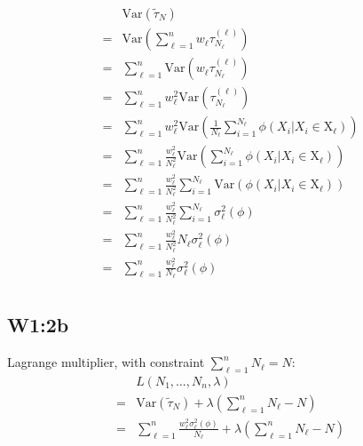 \documentclass{article}
\begin{document}
\begin{align*}
   & \text{Var}(\tilde{\tau}_N) \\
   =& \text{Var}\left(\sum_{\ell=1}^n w_\ell\tau_{N_\ell}^{(\ell)}\right) \\
   =& \sum_{\ell=1}^n \text{Var}\left(w_\ell\tau_{N_\ell}^{(\ell)}\right) \\
   =& \sum_{\ell=1}^n w_\ell^2\text{Var}\left(\tau_{N_\ell}^{(\ell)}\right) \\
   =& \sum_{\ell=1}^n w_\ell^2\text{Var}\left( \frac{1}{N_\ell} \sum_{i=1}^{N_\ell} \phi(X_i|X_i\in\text{X}_\ell) \right) \\
   =& \sum_{\ell=1}^n \frac{w_\ell^2}{N_\ell^2}\text{Var}\left( \sum_{i=1}^{N_\ell} \phi(X_i|X_i\in\text{X}_\ell) \right) \\
   =& \sum_{\ell=1}^n \frac{w_\ell^2}{N_\ell^2}\sum_{i=1}^{N_\ell} \text{Var}\left( \phi(X_i|X_i\in\text{X}_\ell) \right) \\
   =& \sum_{\ell=1}^n \frac{w_\ell^2}{N_\ell^2}\sum_{i=1}^{N_\ell} \sigma_\ell^2(\phi) \\
   =& \sum_{\ell=1}^n \frac{w_\ell^2}{N_\ell^2}N_\ell \sigma_\ell^2(\phi) \\
   =& \sum_{\ell=1}^n \frac{w_\ell^2}{N_\ell} \sigma_\ell^2(\phi) \\
\end{align*}

\subsection{W1:2b}

Lagrange multiplier, with constraint \(\sum_{\ell=1}^n N_\ell = N\):
\begin{align*}
   & L(N_1,\ldots,N_n,\lambda) \\
   =& \text{Var}(\tilde\tau_N)+\lambda\left(\sum_{\ell=1}^n N_\ell - N\right) \\
   =& \sum_{\ell=1}^n \frac{w_\ell^2\sigma_\ell^2(\phi)}{N_\ell}+\lambda\left(\sum_{\ell=1}^n N_\ell - N\right) \\
\end{align*}
\end{document}
